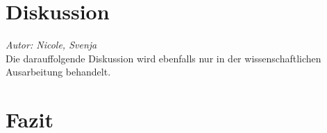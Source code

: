 \documentclass{Bericht}
\begin{document}
\section{Diskussion}
\textit{Autor: Nicole, Svenja}\\
Die darauffolgende Diskussion wird ebenfalls nur in der wissenschaftlichen Ausarbeitung behandelt.


\section{Fazit} %


\end{document}
